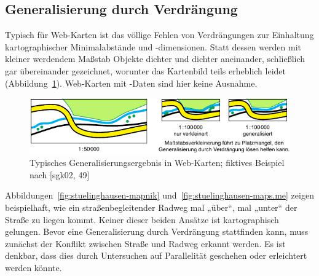 \documentclass[../main/thesis.tex]{subfiles}
\begin{document}
\subsection{Generalisierung durch Verdrängung}

Typisch für Web-Karten ist das völlige Fehlen von Verdrängungen zur Einhaltung kartographischer Minimalabstände und -dimensionen.
Statt dessen werden mit kleiner werdendem Maßstab Objekte dichter und dichter aneinander, schließlich gar übereinander gezeichnet, worunter das Kartenbild teils erheblich leidet (Abbildung~\ref{fig:verdraengung}).
Web-Karten mit \osm-Daten sind hier keine Ausnahme.

\begin{figure}[ht]
    \centering
    \includegraphics[width=\ScaleIfNeeded]{../chapter2/verdraengung}
    \caption{Typisches Generalisierungsergebnis in Web-Karten; fiktives Beispiel nach [sgk02, 49]}\label{fig:verdraengung}
\end{figure}

Abbildungen~\ref{fig:stuelinghausen-mapnik} und~\ref{fig:stuelinghausen-maps.me} zeigen beispielhaft, wie ein straßenbegleitender Radweg mal „über“, mal „unter“ der Straße zu liegen kommt.
Keiner dieser beiden Ansätze ist kartographisch gelungen.
Bevor eine Generalisierung durch Verdrängung stattfinden kann, muss zunächst der Konflikt zwischen Straße und Radweg erkannt werden.
Es ist denkbar, dass dies durch Untersuchen auf Parallelität geschehen oder erleichtert werden könnte.
\end{document}
